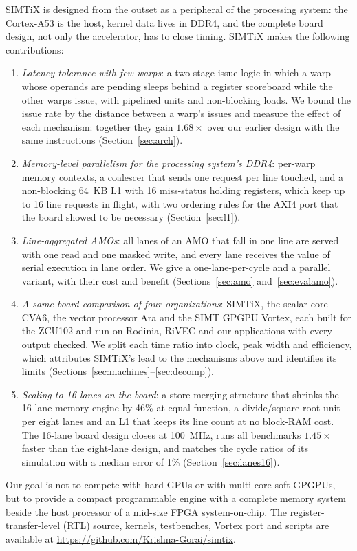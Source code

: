 \documentclass[journal]{IEEEtran}
\begin{document}
SIMTiX is designed from the outset as a peripheral of the processing system: the
Cortex-A53 is the host, kernel data lives in DDR4, and the complete board design,
not only the accelerator, has to close timing. SIMTiX makes the following
contributions:
\begin{enumerate}
\item \emph{Latency tolerance with few warps}: a two-stage issue logic in which a
warp whose operands are pending sleeps behind a register scoreboard while the other
warps issue, with pipelined units and non-blocking loads. We bound the issue rate by
the distance between a warp's issues and measure the effect of each mechanism: together
they gain $1.68\times$ over our earlier design with the same instructions
(Section~\ref{sec:arch}).
\item \emph{Memory-level parallelism for the processing system's DDR4}: per-warp
memory contexts, a coalescer that sends one request per line touched, and a
non-blocking 64~KB L1 with 16 miss-status holding registers, which keep up to 16
line requests in flight, with two ordering rules for the AXI4 port that the board
showed to be necessary (Section~\ref{sec:l1}).
\item \emph{Line-aggregated AMOs}: all lanes of an AMO that fall in one line are
served with one read and one masked write, and every lane receives the value of
serial execution in lane order. We give a one-lane-per-cycle and a parallel
variant, with their cost and benefit (Sections~\ref{sec:amo}
and~\ref{sec:evalamo}).
\item \emph{A same-board comparison of four organizations}: SIMTiX, the scalar core
CVA6, the vector processor Ara and the SIMT GPGPU Vortex, each built for the ZCU102
and run on Rodinia, RiVEC and our applications with every output checked. We split
each time ratio into clock, peak width and efficiency, which attributes SIMTiX's
lead to the mechanisms above and identifies its limits
(Sections~\ref{sec:machines}--\ref{sec:decomp}).
\item \emph{Scaling to 16 lanes on the board}: a store-merging structure that shrinks
the 16-lane memory engine by 46\% at equal function, a divide/square-root
unit per eight lanes and an L1 that keeps its line count at no block-RAM cost. The
16-lane board design closes at 100~MHz, runs all benchmarks $1.45\times$ faster than
the eight-lane design, and matches the cycle ratios of its simulation with a median
error of 1\% (Section~\ref{sec:lanes16}).
\end{enumerate}
Our goal is not to compete with hard GPUs or with multi-core soft GPGPUs, but to
provide a compact programmable engine with a complete memory system beside the
host processor of a mid-size FPGA system-on-chip. The register-transfer-level
(RTL) source, kernels, testbenches, Vortex port and scripts are available at
\url{https://github.com/Krishna-Gorai/simtix}.
\end{document}
